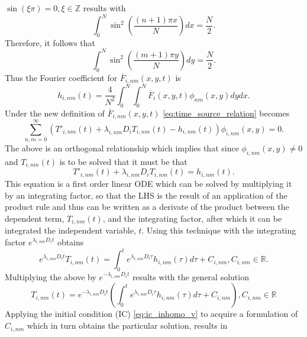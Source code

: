 \documentclass[\main/thesis.tex]{subfiles}
\begin{document}
$\sin(\xi \pi) {=} 0, \xi {\in} \mathbb{Z}$ results with
\begin{equation*}
\int_{0}^{N} \sin^2\left( \frac{(n+1)\pi x}{N} \right) dx {=} \frac{N}{2}.
\end{equation*}
Therefore, it follows that
\begin{equation*}
\int_{0}^{N} \sin^2\left( \frac{(m+1)\pi y}{N} \right) dy {=} \frac{N}{2}.
\end{equation*}
Thus the Fourier coefficient for $\overline{F}_{i,nm}(x, y, t)$ is 
\begin{equation}
h_{i,nm}(t) {=} \frac{4}{N^2} \int_{0}^{N} \int_{0}^{N} \overline{F}_i(x, y, t) \phi_{nm}(x, y) dy dx.
\label{eq:fourier_coeff_F}
\end{equation} 
Under the new definition of $\overline{F}_{i, nm}(x, y, t)$ \eqref{eq:time_source_relation} becomes
\begin{equation*}
\sum_{n,m{=}0}^{\infty} \left( T'_{i,nm}(t) {+} \lambda_{i,nm} D_i T_{i,nm}(t) {-} h_{i,nm}(t) \right) \phi_{i,nm}(x, y) {=} 0.
\end{equation*}
The above is an orthogonal relationship which implies that since $\phi_{i,nm}(x, y) {\ne} 0$ and $T_{i,nm}(t)$ is to be solved that it must be that
\begin{equation*}
T'_{i,nm}(t) {+} \lambda_{i,nm} D_i T_{i,nm}(t) {=} h_{i,nm}(t).
\end{equation*}
This equation is a first order linear ODE which can be solved by multiplying it by an integrating factor, so that the LHS is the result of an application of the product rule and thus can be written as a 
derivate of the product between the dependent term, $T_{i,nm}(t)$, and the integrating factor, after which it can be integrated \wrt the independent variable, $t$. 
Using this technique with the integrating factor $e^{\lambda_{i, nm} D_i t}$ obtains  
\begin{equation*}
e^{\lambda_{i,nm} D_i t} T_{i,nm}(t) {=} \int_{0}^{t} e^{\lambda_{i,nm} D_i \tau} h_{i,nm}(\tau) d\tau {+} C_{i,nm}, C_{i,nm} {\in} \mathbb{R}.
\end{equation*}
Multiplying the above by $e^{\minus\lambda_{i,nm} D_i t}$ results with the general solution
\begin{equation}
T_{i,nm}(t) {=} e^{\minus\lambda_{i,nm} D_i t} \left( \int_{0}^{t} e^{\lambda_{i,nm} D_i \tau} h_{i,nm}(\tau) d\tau {+} C_{i,nm} \right), C_{i,nm} {\in} \mathbb{R}
\label{eq:time_depen_sol}
\end{equation}
Applying the initial condition (IC) \eqref{eq:ic_inhomo_v} to acquire a formulation of $C_{i,nm}$ which in turn obtains the particular solution, results in
\end{document}
